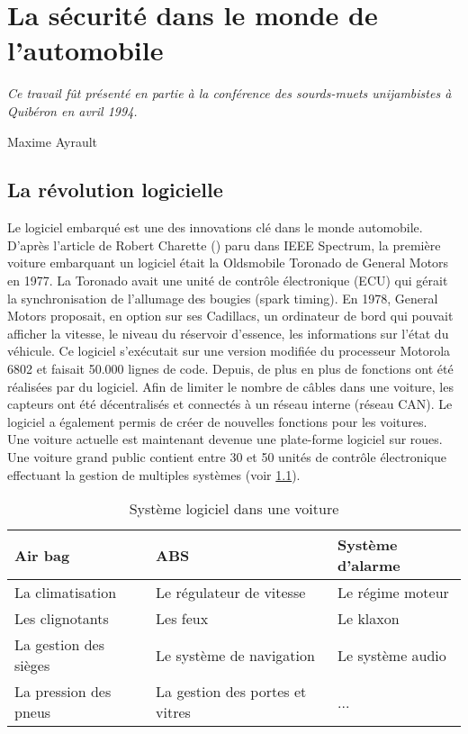 
\chapter{La s\'ecurit\'e dans le monde de l'automobile} \label{CHAP2}
\smallskip
\hfill
\begin{minipage}[b]{8cm}
{\it Ce travail f\^ut pr\'esent\'e en partie \`a la conf\'erence des sourds-muets unijambistes \`a Quib\'eron en avril 1994.}
\end{minipage}
\begin{flushright} Maxime Ayrault \end{flushright}
\vskip 2cm

\section {La r\'evolution logicielle}
\medskip
{\Huge L}e logiciel embarqu\'e est une des innovations cl\'e dans le monde automobile.
D'apr\`es l'article de Robert Charette (\cite{Cha09}) paru dans IEEE Spectrum, la premi\`ere voiture embarquant un logiciel \'etait la Oldsmobile Toronado de General Motors en 1977. La Toronado avait une unit\'e de contr\^ole \'electronique (ECU) qui g\'erait la synchronisation de l'allumage des bougies (spark timing). En 1978, General Motors proposait, en option sur ses Cadillacs, un ordinateur de bord qui pouvait afficher la vitesse, le niveau du r\'eservoir d'essence, les informations sur l'\'etat du v\'ehicule. Ce logiciel s'ex\'ecutait sur une version modifi\'ee du processeur Motorola 6802 et faisait 50.000 lignes de code. Depuis, de plus en plus de fonctions ont \'et\'e r\'ealis\'ees par du logiciel. Afin de limiter le nombre de c\^ables dans une voiture, les capteurs ont \'et\'e d\'ecentralis\'es et connect\'es \`a un r\'eseau interne (r\'eseau CAN). Le logiciel a \'egalement permis de cr\'eer de nouvelles fonctions pour les voitures. \\
Une voiture actuelle est maintenant devenue une plate-forme logiciel sur roues. Une voiture grand public contient entre 30 et 50 unit\'es de contr\^ole \'electronique effectuant la gestion de multiples syst\`emes (voir \ref{tab:soft}).

\FloatBarrier
\begin{table}
\centering
\begin{tabular}{| l | l | l |}
\hline
Air bag & ABS & Syst\`eme d'alarme \\
\hline
La climatisation & Le r\'egulateur de vitesse & Le r\'egime moteur \\
\hline
Les clignotants & Les feux & Le klaxon \\
\hline
La gestion des si\`eges & Le syst\`eme de navigation & Le syst\`eme audio \\
\hline
La pression des pneus & La gestion des portes et vitres & ... \\
\hline
\end{tabular}
\caption{Syst\`eme logiciel dans une voiture}
\label{tab:soft}
\end{table}
\FloatBarrier


